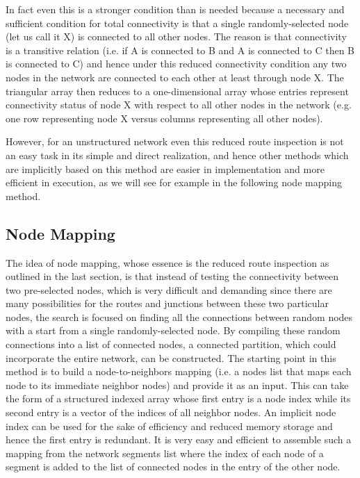 \documentclass[a4paper,12pt]{article}
\begin{document}
In fact even this is a stronger condition than is needed because a necessary and sufficient
condition for total connectivity is that a single randomly-selected node (let us call it X) is
connected to all other nodes. The reason is that connectivity is a transitive relation (i.e. if A
is connected to B and A is connected to C then B is connected to C) and hence under this reduced
connectivity condition any two nodes in the network are connected to each other at least through
node X. The triangular array then reduces to a one-dimensional array whose entries represent
connectivity status of node X with respect to all other nodes in the network (e.g. one row
representing node X versus  columns representing all other nodes).

However, for an unstructured network even this reduced route inspection is not an easy task in its
simple and direct realization, and hence other methods which are implicitly based on this method
are easier in implementation and more efficient in execution, as we will see for example in the
following node mapping method.

\subsection{Node Mapping}

The idea of node mapping, whose essence is the reduced route inspection as outlined in the last
section, is that instead of testing the connectivity between two pre-selected nodes, which is very
difficult and demanding since there are many possibilities for the routes and junctions between
these two particular nodes, the search is focused on finding all the connections between random
nodes with a start from a single randomly-selected node. By compiling these random connections into
a list of connected nodes, a connected partition, which could incorporate the entire network, can
be constructed. The starting point in this method is to build a node-to-neighbors mapping (i.e. a
nodes list that maps each node to its immediate neighbor nodes) and provide it as an input. This
can take the form of a structured indexed array whose first entry is a node index while its second
entry is a vector of the indices of all neighbor nodes. An implicit node index can be used for the
sake of efficiency and reduced memory storage and hence the first entry is redundant. It is very
easy and efficient to assemble such a mapping from the network segments list where the index of
each node of a segment is added to the list of connected nodes in the entry of the other node.
\end{document}
